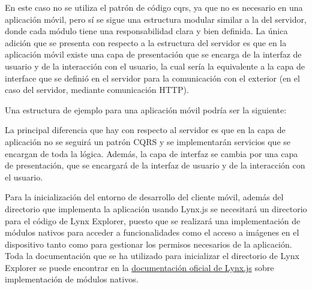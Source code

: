 En este caso no se utiliza el patrón de código \acrshort{cqrs}, ya que no es necesario en una aplicación móvil, pero sí se sigue una estructura modular similar a la del servidor, donde cada módulo tiene una responsabilidad clara y bien definida.
La única adición que se presenta con respecto a la estructura del servidor es que en la aplicación móvil existe una capa de presentación que se encarga de la interfaz de usuario y de la interacción con el usuario, la cual sería la equivalente a la capa de interface que se definió en el servidor para la comunicación con el exterior (en el caso del servidor, mediante comunicación HTTP).

Una estructura de ejemplo para una aplicación móvil podría ser la siguiente:


La principal diferencia que hay con respecto al servidor es que en la capa de aplicación no se seguirá un patrón CQRS y se implementarán servicios que se encargan de toda la lógica.
Además, la capa de interfaz se cambia por una capa de presentación, que se encargará de la interfaz de usuario y de la interacción con el usuario.

Para la inicialización del entorno de desarrollo del cliente móvil, además del directorio que implementa la aplicación usando Lynx.js se necesitará un directorio para el código de Lynx Explorer, puesto que se realizará una implementación de módulos nativos para acceder a funcionalidades como el acceso a imágenes en el dispositivo tanto como para gestionar los permisos necesarios de la aplicación.
Toda la documentación que se ha utilizado para inicializar el directorio de Lynx Explorer se puede encontrar en la \href{https://lynxjs.org/guide/use-native-modules.html#platform=android}{documentación oficial de Lynx.js} sobre implementación de módulos nativos.




